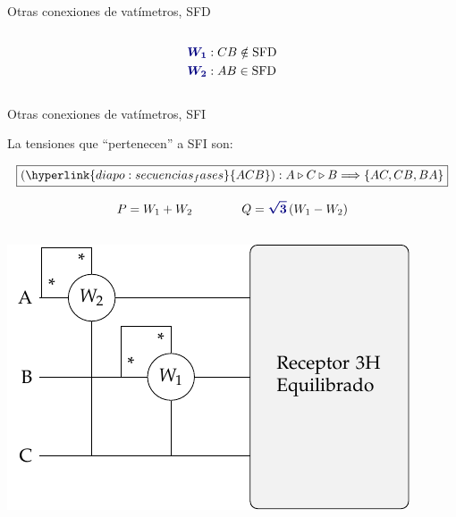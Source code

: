 \documentclass[aspectratio=169, usenames,svgnames,dvipsnames]{beamer}
\begin{document}
\begin{frame}{Otras conexiones de vatímetros, \hspace{3mm}SFD}
\begin{columns}
\begin{column}{0.33\columnwidth}
        \vspace{-8mm}
        \begin{align*}
          {\boldsymbol{\color{blue!50!black} W_1}}&: CB \notin \text{SFD}\\
          {\boldsymbol{\color{blue!50!black} W_2}}&: AB \in \text{SFD}
        \end{align*}
    \end{column}
    \end{columns}
\end{frame}


\begin{frame}{Otras conexiones de vatímetros, \hspace{3mm}SFI}

    \vspace{2mm}
    La tensiones que ``pertenecen'' a \alert{SFI} son:

    \vspace{-4mm}
    \[
      \boxed{(\hyperlink{diapo:secuencias_fases}{ACB}): A \triangleright C \triangleright B \Longrightarrow \{AC, CB, BA\}}
    \]

    \vspace{-2mm}
    \[
      P = W_1 + W_2\qquad \qquad Q = {\boldsymbol{\color{blue!50!black} \sqrt{3}}} \, (W_1 - W_2)
    \]
    
    \begin{columns}
    \begin{column}{0.33\columnwidth}
        \begin{center}
            \includegraphics[width=1\linewidth]{../figs/Potencia3H_Equilibrado_AB_SFI.pdf}
        \end{center}
        

\end{column}
\end{columns}
\end{frame}
\end{document}
